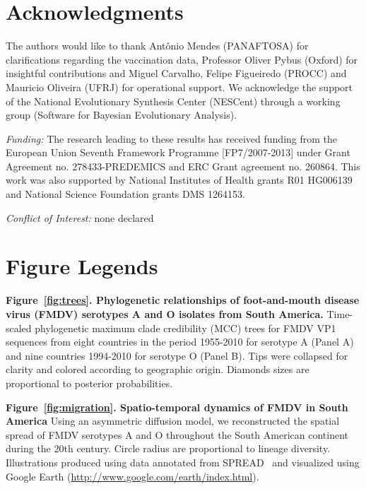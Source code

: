 \documentclass[10pt]{article}
\begin{document}
\section*{Acknowledgments}
The authors would like to thank Ant\^onio Mendes (PANAFTOSA) for clarifications regarding the vaccination data, Professor Oliver Pybus (Oxford) for insightful contributions and Miguel Carvalho, Felipe Figueiredo (PROCC) and Mauricio Oliveira (UFRJ) for operational support.
We acknowledge the support of the National Evolutionary Synthesis Center (NESCent) through a working group (Software for Bayesian Evolutionary Analysis).

\emph{Funding:} The research leading to these results has received funding from the European Union Seventh Framework Programme [FP7/2007-2013] under Grant Agreement no. 278433-PREDEMICS and ERC Grant agreement no. 260864.
This work was also supported by National Institutes of Health grants R01 HG006139 and National Science Foundation grants DMS 1264153.

\emph{Conflict of Interest:} none declared

\newpage

\newpage
\section*{Figure Legends}
{\bf Figure~\ref{fig:trees}. Phylogenetic relationships of foot-and-mouth disease virus (FMDV) serotypes A and O isolates from South America.} Time-scaled phylogenetic maximum clade credibility (MCC) trees for FMDV VP1 sequences from eight countries in the period 1955-2010 for serotype A (Panel A) and nine countries 1994-2010 for serotype O (Panel B).
Tips were collapsed for clarity and colored according to geographic origin.
Diamonds sizes are proportional to posterior probabilities.

{\bf Figure~\ref{fig:migration}. Spatio-temporal dynamics of FMDV in South America} Using an asymmetric diffusion model, we reconstructed the spatial spread of FMDV serotypes A and O throughout the South American continent during the 20th century.
Circle radius are proportional to lineage diversity.
Illustrations produced using data annotated from SPREAD~\cite{spread} and visualized using Google Earth (\url{http://www.google.com/earth/index.html}).
\end{document}
